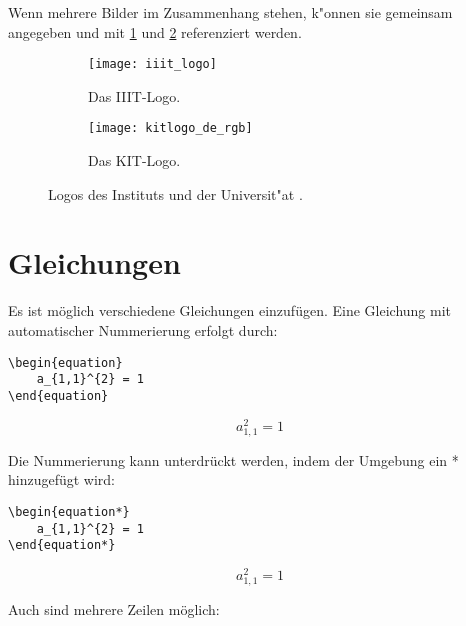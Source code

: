 Wenn mehrere Bilder im Zusammenhang stehen, k"onnen sie gemeinsam angegeben und mit \ref{subfig:iiitlogo} und \ref{subfig:kitlogo} referenziert werden.
\begin{figure}[tb]
    \centering
    \null
    \hfill
    \begin{subfigure}{.3\textwidth}
        \centering
        \texttt{[image: iiit\_logo]}
        \caption{Das IIIT-Logo.}
        \label{subfig:iiitlogo}
    \end{subfigure}
    \hfill
    \begin{subfigure}{.3\textwidth}
        \centering
        \texttt{[image: kitlogo\_de\_rgb]}
        \caption{Das KIT-Logo.}
        \label{subfig:kitlogo}
    \end{subfigure}
    \hfill\null %
    \caption[Logos des Instituts und der Universit"at.]{Logos des Instituts  und der Universit"at .}
    \label{fig:Logos}
\end{figure}

\section{Gleichungen}
Es ist möglich verschiedene Gleichungen einzufügen. Eine Gleichung mit automatischer Nummerierung erfolgt durch:

\begin{lstlisting}[style=latex]
\begin{equation} 
	a_{1,1}^{2} = 1 
\end{equation}
\end{lstlisting}
\begin{equation}
    a_{1,1}^{2} = 1
\end{equation}

Die Nummerierung kann unterdrückt werden, indem der Umgebung ein * hinzugefügt wird:

\begin{lstlisting}[style=latex]
\begin{equation*} 
	a_{1,1}^{2} = 1 
\end{equation*}
\end{lstlisting}
\begin{equation*}
    a_{1,1}^{2} = 1
\end{equation*}

Auch sind mehrere Zeilen möglich:

